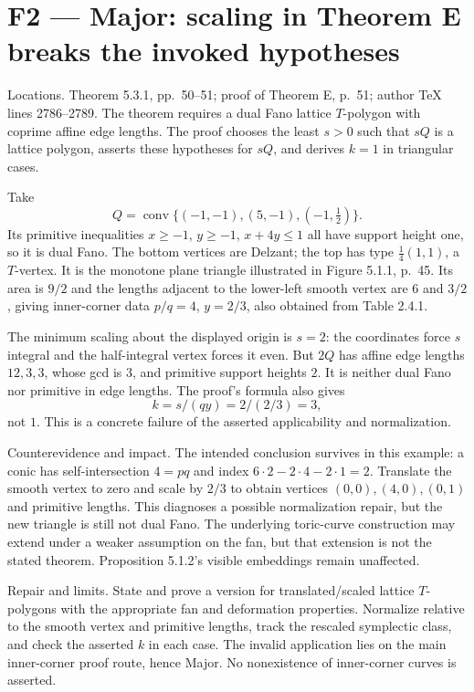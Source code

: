 \documentclass[10pt]{article}
\begin{document}
\section*{F2 — Major: scaling in Theorem E breaks the invoked hypotheses}
Locations. Theorem 5.3.1, pp. 50–51; proof of Theorem E, p. 51; author TeX lines 2786–2789. The theorem requires a dual Fano lattice \(T\)-polygon with coprime affine edge lengths. The proof chooses the least \(s>0\) such that \(sQ\) is a lattice polygon, asserts these hypotheses for \(sQ\), and derives \(k=1\) in triangular cases.\par
Take \[Q=\operatorname{conv}\{(-1,-1),(5,-1),(-1,\tfrac12)\}.\] Its primitive inequalities \(x\geq-1\), \(y\geq-1\), \(x+4y\leq1\) all have support height one, so it is dual Fano. The bottom vertices are Delzant; the top has type \(\frac14(1,1)\), a \(T\)-vertex. It is the monotone plane triangle illustrated in Figure 5.1.1, p. 45. Its area is \(9/2\) and the lengths adjacent to the lower-left smooth vertex are \(6\) and \(3/2\), giving inner-corner data \(p/q=4\), \(y=2/3\), also obtained from Table 2.4.1.\par
The minimum scaling about the displayed origin is \(s=2\): the coordinates force \(s\) integral and the half-integral vertex forces it even. But \(2Q\) has affine edge lengths \(12,3,3\), whose gcd is \(3\), and primitive support heights \(2\). It is neither dual Fano nor primitive in edge lengths. The proof’s formula also gives \[k=s/(qy)=2/(2/3)=3,\] not \(1\). This is a concrete failure of the asserted applicability and normalization.\par
Counterevidence and impact. The intended conclusion survives in this example: a conic has self-intersection \(4=pq\) and index \(6\cdot2-2\cdot4-2\cdot1=2\). Translate the smooth vertex to zero and scale by \(2/3\) to obtain vertices \((0,0),(4,0),(0,1)\) and primitive lengths. This diagnoses a possible normalization repair, but the new triangle is still not dual Fano. The underlying toric-curve construction may extend under a weaker assumption on the fan, but that extension is not the stated theorem. Proposition 5.1.2’s visible embeddings remain unaffected.\par
Repair and limits. State and prove a version for translated/scaled lattice \(T\)-polygons with the appropriate fan and deformation properties. Normalize relative to the smooth vertex and primitive lengths, track the rescaled symplectic class, and check the asserted \(k\) in each case. The invalid application lies on the main inner-corner proof route, hence Major. No nonexistence of inner-corner curves is asserted.\par
\end{document}
